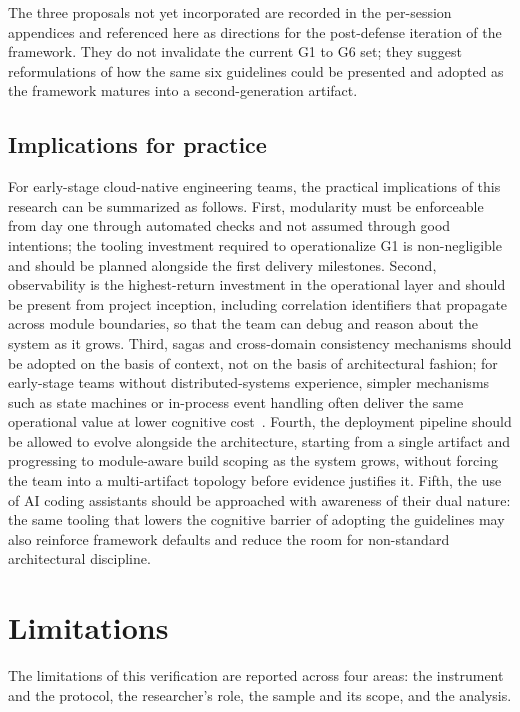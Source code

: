 The three proposals not yet incorporated are recorded in the per-session appendices and referenced here as directions for the post-defense iteration of the framework. They do not invalidate the current G1 to G6 set; they suggest reformulations of how the same six guidelines could be presented and adopted as the framework matures into a second-generation artifact.

\subsection*{Implications for practice}

For early-stage cloud-native engineering teams, the practical implications of this research can be summarized as follows. First, modularity must be enforceable from day one through automated checks and not assumed through good intentions; the tooling investment required to operationalize G1 is non-negligible and should be planned alongside the first delivery milestones. Second, observability is the highest-return investment in the operational layer and should be present from project inception, including correlation identifiers that propagate across module boundaries, so that the team can debug and reason about the system as it grows. Third, sagas and cross-domain consistency mechanisms should be adopted on the basis of context, not on the basis of architectural fashion; for early-stage teams without distributed-systems experience, simpler mechanisms such as state machines or in-process event handling often deliver the same operational value at lower cognitive cost~\cite{newman2019monolith}. Fourth, the deployment pipeline should be allowed to evolve alongside the architecture, starting from a single artifact and progressing to module-aware build scoping as the system grows, without forcing the team into a multi-artifact topology before evidence justifies it. Fifth, the use of AI coding assistants should be approached with awareness of their dual nature: the same tooling that lowers the cognitive barrier of adopting the guidelines may also reinforce framework defaults and reduce the room for non-standard architectural discipline.

\section{Limitations}
\label{sec:limitations}

The limitations of this verification are reported across four areas: the instrument and the protocol, the researcher's role, the sample and its scope, and the analysis.

